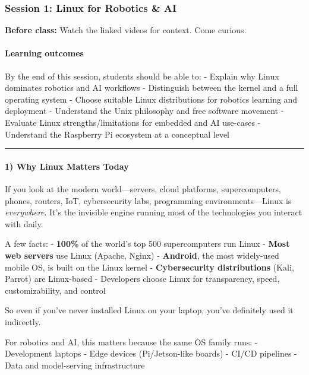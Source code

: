 \documentclass[
  english,
  paper=a4,
  oneside  ,captions=tableheading
]{scrartcl}
\renewenvironment{quote}{\begin{customblockquote}\list{}{\rightmargin=0em\leftmargin=0em}%
\item\relax\color{blockquote-text}\ignorespaces}{\unskip\unskip\endlist\end{customblockquote}}
\begin{document}
\subsubsection{Session 1: Linux for Robotics \&
AI}\label{session-1-linux-for-robotics-ai}

\begin{quote}
\textbf{Before class:} Watch the linked videos for context. Come
curious.
\end{quote}

\paragraph{Learning outcomes}\label{learning-outcomes}

By the end of this session, students should be able to: - Explain why
Linux dominates robotics and AI workflows - Distinguish between the
kernel and a full operating system - Choose suitable Linux distributions
for robotics learning and deployment - Understand the Unix philosophy
and free software movement - Evaluate Linux strengths/limitations for
embedded and AI use-cases - Understand the Raspberry Pi ecosystem at a
conceptual level

\begin{center}\rule{0.5\linewidth}{0.5pt}\end{center}

\paragraph{1) Why Linux Matters Today}\label{why-linux-matters-today}

If you look at the modern world---servers, cloud platforms,
supercomputers, phones, routers, IoT, cybersecurity labs, programming
environments---Linux is \emph{everywhere}. It's the invisible engine
running most of the technologies you interact with daily.

A few facts: - \textbf{100\%} of the world's top 500 supercomputers run
Linux - \textbf{Most web servers} use Linux (Apache, Nginx) -
\textbf{Android}, the most widely-used mobile OS, is built on the Linux
kernel - \textbf{Cybersecurity distributions} (Kali, Parrot) are
Linux-based - Developers choose Linux for transparency, speed,
customizability, and control

So even if you've never installed Linux on your laptop, you've
definitely used it indirectly.

For robotics and AI, this matters because the same OS family runs: -
Development laptops - Edge devices (Pi/Jetson-like boards) - CI/CD
pipelines - Data and model-serving infrastructure
\end{document}
